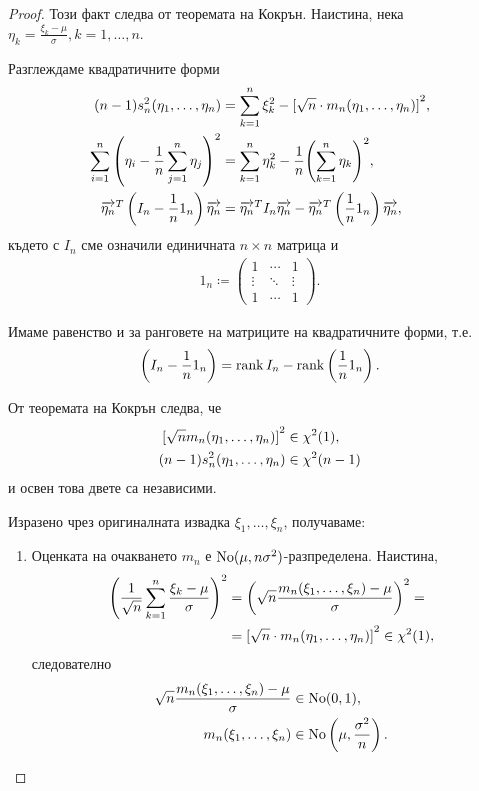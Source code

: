 \documentclass[
  numbers=endperiod,
  headings=standardclasses,
  bibliography=totocnumbered,
]{scrartcl}
\begin{document}
\begin{proof}
  Този факт следва от теоремата на Кокрън. Наистина, нека \( \eta_k = \frac {\xi_k - \mu} \sigma, k = 1, \ldots, n \).

  Разглеждаме квадратичните форми
  \begin{align*}
    (n-1) s_n^2(\eta_1, \ldots, \eta_n)
    &=
    \sum_{k=1}^n \xi_k^2 - {[\sqrt n \cdot m_n(\eta_1, \ldots, \eta_n)]}^2,
    \\
    \sum_{i=1}^n {\left(\eta_i - \frac 1 n \sum_{j=1}^n \eta_j \right)}^2
    &=
    \sum_{k=1}^n \eta_k^2 - \frac 1 n {\left(\sum_{k=1}^n \eta_k \right)}^2,
    \\
    \overrightarrow{\eta_n}^T \left(I_n - \frac 1 n 1_n \right) \overrightarrow{\eta_n}
    &=
    \overrightarrow{\eta_n}^T I_n \overrightarrow{\eta_n} - \overrightarrow{\eta_n}^T \left(\frac 1 n 1_n \right) \overrightarrow{\eta_n},
  \end{align*}
  където с \( I_n \) сме означили единичната \( n \times n \) матрица и
  \begin{align*}
    1_n
    \coloneqq
    \begin{pmatrix}
      1 & \cdots & 1 \\
      \vdots & \ddots & \vdots \\
      1 & \cdots & 1
    \end{pmatrix}.
  \end{align*}

  Имаме равенство и за ранговете на матриците на квадратичните форми, т.е.
  \begin{equation*}
    \left(I_n - \frac 1 n 1_n \right) = \operatorname{rank} I_n - \operatorname{rank} \left( \frac 1 n 1_n \right).
  \end{equation*}

  От теоремата на Кокрън следва, че
  \begin{align*}
    {[\sqrt n m_n(\eta_1, \ldots, \eta_n)]}^2 &\in \chi^2(1),
    \\
    (n-1) s_n^2(\eta_1, \ldots, \eta_n) &\in \chi^2(n - 1)
  \end{align*}
  и освен това двете са независими.

  Изразено чрез оригиналната извадка \( \xi_1, \ldots, \xi_n \), получаваме:
  \begin{enumerate}
    \item Оценката на очакването \( m_n \) е \( \operatorname{No}(\mu, n \sigma^2) \)-разпределена. Наистина,
    \begin{align*}
      {\left(\frac 1 {\sqrt n} \sum_{k=1}^n \frac {\xi_k - \mu} \sigma \right)}^2
      &=
      {\left( \sqrt n \frac {m_n(\xi_1, \ldots, \xi_n) - \mu} \sigma \right)}^2
      = \\ &=
      {[\sqrt n \cdot m_n(\eta_1, \ldots, \eta_n)]}^2
      \in
      \chi^2(1),
    \end{align*}
    следователно
    \begin{align*}
      \sqrt n \frac {m_n(\xi_1, \ldots, \xi_n) - \mu} \sigma &\in \operatorname{No}(0, 1),
      \\
      m_n(\xi_1, \ldots, \xi_n) &\in \operatorname{No} \left(\mu, \frac {\sigma^2} n \right).
    \end{align*}


\end{enumerate}
\end{proof}
\end{document}
